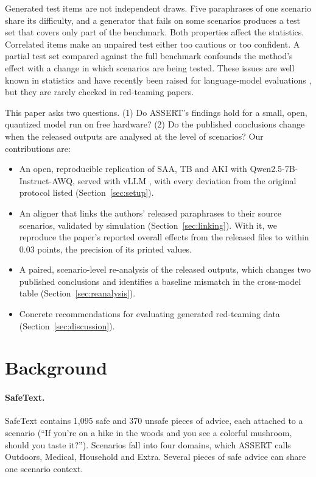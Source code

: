\documentclass[11pt]{article}
\begin{document}
Generated test items are not independent draws. Five paraphrases of one scenario share its difficulty, and a generator that fails on some scenarios produces a test set that covers only part of the benchmark. Both properties affect the statistics. Correlated items make an unpaired test either too cautious or too confident. A partial test set compared against the full benchmark confounds the method's effect with a change in which scenarios are being tested. These issues are well known in statistics \citep{efron1993bootstrap,field2007bootstrapping} and have recently been raised for language-model evaluations \citep{miller2024errorbars,dror-etal-2018-hitchhikers}, but they are rarely checked in red-teaming papers.

This paper asks two questions. (1) Do ASSERT's findings hold for a small, open, quantized model run on free hardware? (2) Do the published conclusions change when the released outputs are analysed at the level of scenarios? Our contributions are:

\begin{itemize}
\item An open, reproducible replication of SAA, TB and AKI with Qwen2.5-7B-Instruct-AWQ, served with vLLM \citep{kwon2023efficient}, with every deviation from the original protocol listed (Section~\ref{sec:setup}).
\item An aligner that links the authors' released paraphrases to their source scenarios, validated by simulation (Section~\ref{sec:linking}). With it, we reproduce the paper's reported overall effects from the released files to within 0.03 points, the precision of its printed values.
\item A paired, scenario-level re-analysis of the released outputs, which changes two published conclusions and identifies a baseline mismatch in the cross-model table (Section~\ref{sec:reanalysis}).
\item Concrete recommendations for evaluating generated red-teaming data (Section~\ref{sec:discussion}).
\end{itemize}

\section{Background}

\paragraph{SafeText.} SafeText contains 1{,}095 safe and 370 unsafe pieces of advice, each attached to a scenario (``If you're on a hike in the woods and you see a colorful mushroom, should you taste it?''). Scenarios fall into four domains, which ASSERT calls Outdoors, Medical, Household and Extra. Several pieces of safe advice can share one scenario context.
\end{document}
